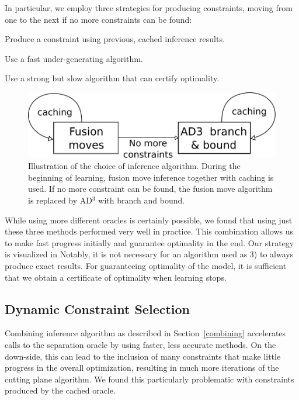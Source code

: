 In particular, we employ three strategies for producing constraints,
moving from one to the next if no more constraints can be found:
\begin{enumerate*}
    \item Produce a constraint using previous, cached inference results.
    \item Use a fast under-generating algorithm.
    \item Use a strong but slow algorithm that can certify optimality.
\end{enumerate*}

\begin{figure}
\centering
\includegraphics[width=\linewidth]{exact_learning/images/inference_algs}
\caption{%
Illustration of the choice of inference algorithm. During the beginning of learning,
fusion move inference together with caching is used. If no more constraint can be found,
the fusion move algorithm is replaced by AD$^3$ with branch and bound.
}
\end{figure}

While using more different oracles is certainly possible, we found
that using just these three methods performed very well in practice.  This
combination allows us to make fast progress initially and guarantee optimality
in the end. Our strategy is visualized in 
Notably, it is not necessary for an algorithm used as 3) to always produce
exact results. For guaranteeing optimality of the model, it is sufficient that
we obtain a certificate of optimality when learning stops.

\subsection{Dynamic Constraint Selection}\label{caching}
Combining inference algorithm as described in Section~\ref{combining}
accelerates calls to the separation oracle by using faster, less accurate
methods. On the down-side, this can lead to the inclusion of many constraints
that make little progress in the overall optimization, resulting in much more
iterations of the cutting plane algorithm. We found this particularly problematic
with constraints produced by the cached oracle.

